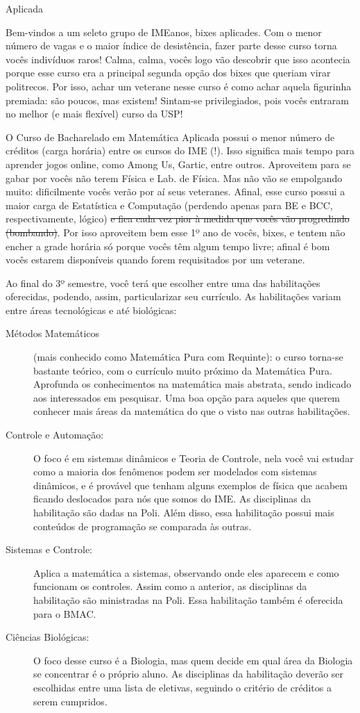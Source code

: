 \begin{subsecao}{Aplicada}

Bem-vindos a um seleto grupo de IMEanos, bixes aplicades. Com o menor número de
vagas e o maior índice de desistência, fazer parte desse curso torna vocês
indivíduos raros!  Calma, calma, vocês logo vão descobrir que isso acontecia
porque esse curso era a principal segunda opção dos bixes que queriam virar
politrecos. Por isso, achar um veterane nesse curso é como achar aquela
figurinha premiada: são poucos, mas existem! Sintam-se privilegiados, pois vocês
entraram no melhor (e mais flexível) curso da USP!

O Curso de Bacharelado em Matemática Aplicada possui o menor número de créditos
(carga horária) entre os cursos do IME (!). Isso significa mais tempo para
aprender jogos online, como Among Us, Gartic, entre outros. Aproveitem para se gabar 
por vocês não terem Física e Lab. de Física. Mas não vão se empolgando muito: 
dificilmente vocês verão por aí seus veteranes. Afinal, esse curso possui a maior carga 
de Estatística e Computação (perdendo apenas para BE e BCC, respectivamente, lógico) 
\sout{e fica cada vez pior à medida que vocês vão progredindo (bombando)}. 
Por isso aproveitem bem esse 1º ano de vocês, bixes, e tentem não encher a grade
horária só porque vocês têm algum tempo livre; afinal é bom vocês estarem
disponíveis quando forem requisitados por um veterane.

Ao final do 3º semestre, você terá que escolher entre uma das habilitações
oferecidas, podendo, assim, particularizar seu currículo. As habilitações variam
entre áreas tecnológicas e até biológicas:
\begin{description}
\item [Métodos Matemáticos] (mais conhecido como Matemática Pura com Requinte):
  o curso torna-se bastante teórico, com o currículo muito próximo da Matemática
  Pura. Aprofunda os conhecimentos na matemática mais abstrata, sendo indicado
  aos interessados em pesquisar. Uma boa opção para aqueles que querem conhecer
  mais áreas da matemática do que o visto nas outras habilitações.
\item [Controle e Automação:]  O foco é em sistemas dinâmicos e Teoria de
  Controle, nela você vai estudar como a maioria dos fenômenos podem ser
  modelados com sistemas dinâmicos, e é provável que tenham alguns exemplos de
  física que acabem ficando deslocados para nós que somos do IME. As disciplinas
  da habilitação são dadas na Poli. Além disso, essa habilitação possui mais
  conteúdos de programação se comparada às outras.
\item [Sistemas e Controle:] Aplica a matemática a sistemas, observando onde
  eles aparecem e como funcionam os controles. Assim como a anterior, as
  disciplinas da habilitação são ministradas na Poli. Essa habilitação também é
  oferecida para o BMAC.
\item [Ciências Biológicas:] O foco desse curso é a Biologia, mas quem decide em
  qual área da Biologia se concentrar é o próprio aluno. As disciplinas da
  habilitação deverão ser escolhidas entre uma lista de eletivas, seguindo o
  critério de créditos a serem cumpridos.
\end{description}


\end{subsecao}
